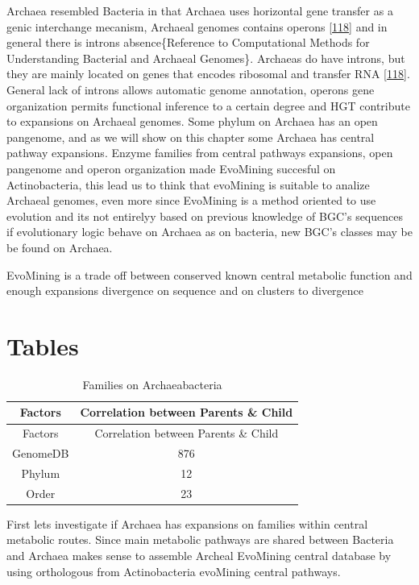 \documentclass[12pt,twoside]{reedthesis}
\begin{document}
  Archaea resembled Bacteria in that Archaea uses horizontal gene transfer
  as a genic interchange mecanism, Archaeal genomes contains operons
  {[}\protect\hyperlink{ref-howlandux5fsurprisingux5f2000}{118}{]} and in
  general there is introns absence\{Reference to Computational Methods for
  Understanding Bacterial and Archaeal Genomes\}. Archaeas do have
  introns, but they are mainly located on genes that encodes ribosomal and
  transfer RNA
  {[}\protect\hyperlink{ref-howlandux5fsurprisingux5f2000}{118}{]}.
  General lack of introns allows automatic genome annotation, operons gene
  organization permits functional inference to a certain degree and HGT
  contribute to expansions on Archaeal genomes. Some phylum on Archaea has
  an open pangenome, and as we will show on this chapter some Archaea has
  central pathway expansions. Enzyme families from central pathways
  expansions, open pangenome and operon organization made EvoMining
  succesful on Actinobacteria, this lead us to think that evoMining is
  suitable to analize Archaeal genomes, even more since EvoMining is a
  method oriented to use evolution and its not entirelyy based on previous
  knowledge of BGC's sequences if evolutionary logic behave on Archaea as
  on bacteria, new BGC's classes may be be found on Archaea.
  
  EvoMining is a trade off between conserved known central metabolic
  function and enough expansions divergence on sequence and on clusters to
  divergence
  
  \section{Tables}\label{tables}
  
  \begin{longtable}[c]{@{}cc@{}}
  \caption{Families on Archaeabacteria \label{tab:inher}}\tabularnewline
  \toprule
  Factors & Correlation between Parents \& Child\tabularnewline
  \midrule
  \endfirsthead
  \toprule
  Factors & Correlation between Parents \& Child\tabularnewline
  \midrule
  \endhead
  GenomeDB & 876\tabularnewline
  Phylum & 12\tabularnewline
  Order & 23\tabularnewline
  \bottomrule
  \end{longtable}
  
  \clearpage
  
  First lets investigate if Archaea has expansions on families within
  central metabolic routes. Since main metabolic pathways are shared
  between Bacteria and Archaea makes sense to assemble Archeal EvoMining
  central database by using orthologous from Actinobacteria evoMining
  central pathways.
  
\end{document}
